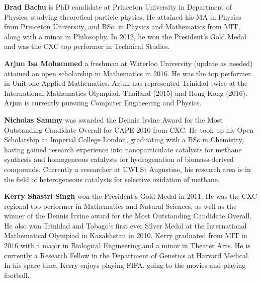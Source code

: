 \textbf{Brad Bachu} is PhD candidate at Princeton
University in Department of Physics, studying theoretical particle physics.
He attained his MA in Physics from Princeton University, and BSc. in Physics 
and Mathematics from MIT, along with a minor in Philosophy. In 2012, 
he won the President's Gold Medal and was the CXC top performer in Technical Studies.

\vspace{5pt}

\noindent\textbf{Arjun Isa Mohammed} a freshman at Waterloo University
(update as needed)
attained an open scholarship in Mathematics in 2016.
He was the top performer in Unit one Applied Mathematics.
Arjun has represented Trinidad twice at the International
Mathematics Olympiad, Thailand (2015) and Hong Kong (2016).
Arjun is currently pursuing Computer Engineering and Physics.
\vspace{5pt}

\noindent\textbf{Nicholas Sammy} was awarded the Dennis Irvine Award for 
the Most Outstanding Candidate Overall for CAPE 2010 from CXC. He took up 
his Open Scholarship at Imperial College London, graduating with a BSc in
Chemistry, having gained research experience into nanoparticulate catalysts 
for methane synthesis and homogeneous catalysts for hydrogenation of
biomass-derived compounds. Currently a researcher at UWI St Augustine,
his research area is in the field of heterogeneous catalysts for selective
oxidation of methane.

\vspace{5pt}

\noindent\textbf{Kerry Shastri Singh} won the President's Gold Medal in
2011. He was the CXC regional top performer in Mathematics and Natural
Sciences, as well as the winner of the Dennis Irvine award for the Most
Outstanding Candidate Overall. He also won Trinidad and Tobago's first
ever Silver Medal at the International Mathematical Olympiad in
Kazakhstan in 2010. Kerry graduated from MIT in 2016 with a major in
Biological Engineering and a minor in Theater Arts. He is currently a
Research Fellow in the Department of Genetics at Harvard Medical. In
his spare time, Kerry enjoys playing FIFA, going to the movies
and playing football.
